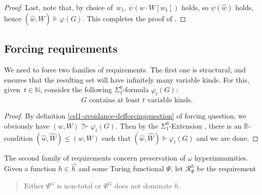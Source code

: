 \documentclass{article}
\def\RR{\mathbb{R}}
\def\R{\mathcal{R}}
\newcommand{\qvdash}{\operatorname{{?}{\vdash}}}
\newcommand{\NN}[0]{\mathbb{N}}
\numberwithin{theorem}{section}
\newtheorem{lemma}[theorem]{Lemma}
\theoremstyle{definition}
\begin{document}
\begin{proof}
Last, note that, by choice of~$w_1$, $\psi(w \cdot W[w_1])$ holds, so $\psi(\hat w)$ holds, hence $(\hat w, \hat W) \Vdash \varphi(G)$. This completes the proof of .
\end{proof}

\subsection{Forcing requirements}

We need to force two families of requirements.
The first one is structural, and ensures that the resulting set will have infinitely many variable kinds.
For this, given~$t \in \NN$, consider the following $\Sigma_1^0$-formula $\varphi_t(G)$:
\begin{align}\label{ccsl1-defvarphi}
&\text{ $G$ contains at least~$t$ variable kinds.}
\end{align}

\begin{proof}
By definition \ref{csl1-avoidance-defforcingquestion} of forcing question, we obviously have
  $(w, W) \qvdash \varphi_t(G)$. Then by the $\Sigma^0_1$-Extension , there is an $\RR$-condition $(\hat w, \hat W) \leq (w, W)$
such that $(\hat w, \hat W) \Vdash \varphi_t(G)$ and we are done.
\end{proof}

The second family of requirements concern preservation of $\omega$ hyperimmunities.
Given a function $h \in \vec{h}$ and some Turing functional $\Psi$, let $\R^h_\Psi$ be the requirement
\begin{quote}
Either $\Psi^G$ is non-total or $\Psi^G $ does not dominate $h$.
\end{quote}
\end{document}
